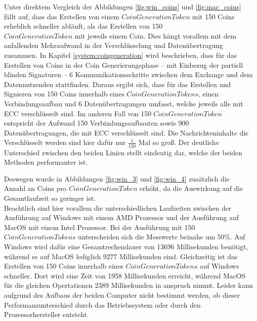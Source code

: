 \documentclass[
	fontsize=12pt,
	headings=small,
	parskip=half,           %
	bibliography=totoc,
	numbers=noenddot,       %
	open=any,               %
]{scrreprt}
\begin{document}
Unter direktem Vergleich der Abbildungen \ref{fig:win_coins} und \ref{fig:mac_coins} fällt auf, dass das Erstellen von einem $CoinGenerationToken$ mit 150 Coins erheblich schneller abläuft, als das Erstellen von 150 \\$CoinGenerationToken$ mit jeweils einem Coin. Dies hängt vorallem mit dem anfallenden Mehraufwand in der Verschlüsselung und Datenübertragung zusammen. In Kapitel \ref{system:coingeneration} wird beschrieben, dass für das Erstellen von Coins in der Coin Generierungsphase -- mit Einbezug der partiell blinden Signaturen -- 6 Kommunikationsschritte zwischen dem Exchange und dem Datennutzenden stattfinden. Daraus ergibt sich, dass für das Erstellen und Signieren von 150 Coins innerhalb eines $CoinGenerationTokens$, einen Verbindungsaufbau und 6 Datenübertragungen umfasst, welche jeweils alle mit ECC verschlüsselt sind. Im anderen Fall von 150 $CoinGenerationToken$ entspricht der Aufwand 150 Verbindungsaufbauten sowie 900 Datenübertragungen, die mit ECC verschlüsselt sind. Die Nachrichteninhalte die Verschlüsselt werden sind hier dafür nur $\frac{1}{150}$ Mal so groß. Der deutliche Unterschied zwischen den beiden Linien stellt eindeutig dar, welche der beiden Methoden performanter ist.

Deswegen wurde in Abbildungen \ref{fig:win_3} und \ref{fig:win_4} zusätzlich die Anzahl an Coins pro $CoinGenerationToken$ erhöht, da die Auswirkung auf die Gesamtlaufzeit so geringer ist.\\

Beachtlich sind hier vorallem die unterschiedlichen Laufzeiten zwischen der Ausführung auf Windows mit einem AMD Prozessor und der Ausführung auf MacOS mit einem Intel Prozessor. Bei der Ausführung mit 150 $CoinGenerationTokens$ unterscheiden sich die Messwerte beinahe um 50\%. Auf Windows wird dafür eine Gesamtrechendauer von 13696 Millisekunden benötigt, während es auf MacOS lediglich 9277 Millisekunden sind. Gleichzeitig ist das Erstellen von 150 Coins innerhalb eines $CoinGenerationTokens$ auf Windows schneller. Dort wird eine Zeit von 1958 Millisekunden erreicht, während MacOS für die gleichen Opertationen 2389 Millisekunden in anspruch nimmt. Leider kann aufgrund des Aufbaus der beiden Computer nicht bestimmt werden, ob dieser Performanzunterschied durch das Betriebssystem oder durch den Prozessorhersteller entsteht.\\
\end{document}
